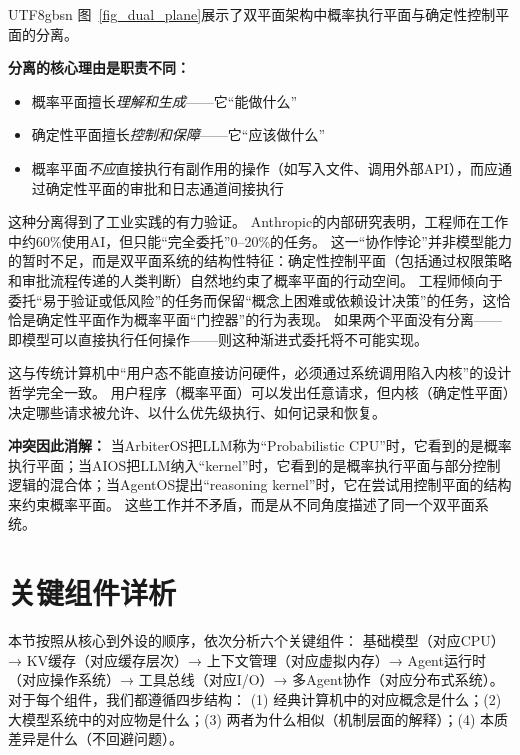 \documentclass[11pt,a4paper]{article}
\begin{document}
\begin{CJK*}{UTF8}{gbsn}
图~\ref{fig_dual_plane}展示了双平面架构中概率执行平面与确定性控制平面的分离。


\textbf{分离的核心理由是职责不同：}
\begin{itemize}[nosep]
\item 概率平面擅长\textit{理解和生成}——它``能做什么''
\item 确定性平面擅长\textit{控制和保障}——它``应该做什么''
\item 概率平面\textit{不应}直接执行有副作用的操作（如写入文件、调用外部API），而应通过确定性平面的审批和日志通道间接执行
\end{itemize}

这种分离得到了工业实践的有力验证。
Anthropic的内部研究表明，工程师在工作中约60\%使用AI，但只能``完全委托''0--20\%的任务\cite{anthropic2026agenticreport}。
这一``协作悖论''并非模型能力的暂时不足，而是双平面系统的结构性特征：确定性控制平面（包括通过权限策略和审批流程传递的人类判断）自然地约束了概率平面的行动空间。
工程师倾向于委托``易于验证或低风险''的任务而保留``概念上困难或依赖设计决策''的任务，这恰恰是确定性平面作为概率平面``门控器''的行为表现。
如果两个平面没有分离——即模型可以直接执行任何操作——则这种渐进式委托将不可能实现。

这与传统计算机中``用户态不能直接访问硬件，必须通过系统调用陷入内核''的设计哲学完全一致\cite{ostep_2023}。
用户程序（概率平面）可以发出任意请求，但内核（确定性平面）决定哪些请求被允许、以什么优先级执行、如何记录和恢复。

\textbf{冲突因此消解：}
当ArbiterOS把LLM称为``Probabilistic CPU''时，它看到的是概率执行平面；当AIOS把LLM纳入``kernel''时，它看到的是概率执行平面与部分控制逻辑的混合体；当AgentOS提出``reasoning kernel''时，它在尝试用控制平面的结构来约束概率平面。
这些工作并不矛盾，而是从不同角度描述了同一个双平面系统。

\section{关键组件详析}
\label{sec:components}

本节按照从核心到外设的顺序，依次分析六个关键组件：
基础模型（对应CPU）→ KV缓存（对应缓存层次）→ 上下文管理（对应虚拟内存）→ Agent运行时（对应操作系统）→ 工具总线（对应I/O）→ 多Agent协作（对应分布式系统）。
对于每个组件，我们都遵循四步结构：
(1) 经典计算机中的对应概念是什么；(2) 大模型系统中的对应物是什么；(3) 两者为什么相似（机制层面的解释）；(4) 本质差异是什么（不回避问题）。


\end{CJK*}
\end{document}
